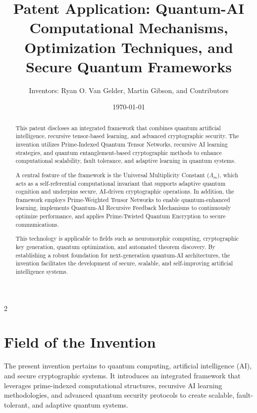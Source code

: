 \documentclass{article}
\title{Patent Application: Quantum-AI Computational Mechanisms, Optimization Techniques, and Secure Quantum Frameworks}
\author{Inventors: Ryan O. Van Gelder, Martin Gibson, and Contributors}
\affil{Citizen Gardens - The Foundation of Multiplicity}
\date{\today}
\theoremstyle{plain}
\begin{document}
\maketitle

\begin{abstract}
This patent discloses an integrated framework that combines quantum artificial intelligence, recursive tensor-based learning, and advanced cryptographic security. The invention utilizes Prime-Indexed Quantum Tensor Networks, recursive AI learning strategies, and quantum entanglement-based cryptographic methods to enhance computational scalability, fault tolerance, and adaptive learning in quantum systems.

A central feature of the framework is the Universal Multiplicity Constant ($\Lambda_m$), which acts as a self-referential computational invariant that supports adaptive quantum cognition and underpins secure, AI-driven cryptographic operations. In addition, the framework employs Prime-Weighted Tensor Networks to enable quantum-enhanced learning, implements Quantum-AI Recursive Feedback Mechanisms to continuously optimize performance, and applies Prime-Twisted Quantum Encryption to secure communications.

This technology is applicable to fields such as neuromorphic computing, cryptographic key generation, quantum optimization, and automated theorem discovery. By establishing a robust foundation for next-generation quantum-AI architectures, the invention facilitates the development of secure, scalable, and self-improving artificial intelligence systems.
\end{abstract}
\newpage
 \begin{multicols}{2}
\begin{singlespace}
\tableofcontents
\end{singlespace}
\end{multicols}
\newpage
\section{Field of the Invention}
The present invention pertains to quantum computing, artificial intelligence (AI), and secure cryptographic systems. It introduces an integrated framework that leverages prime-indexed computational structures, recursive AI learning methodologies, and advanced quantum security protocols to create scalable, fault-tolerant, and adaptive quantum systems.
\end{document}
